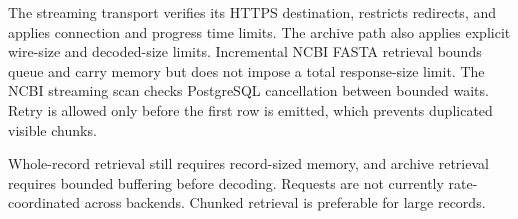 The streaming transport verifies its HTTPS destination, restricts redirects,
and applies connection and progress time limits. The archive path also applies
explicit wire-size and decoded-size limits. Incremental NCBI FASTA retrieval
bounds queue and carry memory but does not impose a total response-size limit.
The NCBI streaming scan checks PostgreSQL cancellation between bounded waits.
Retry is allowed only before the first row is emitted, which prevents duplicated
visible chunks.

Whole-record retrieval still requires record-sized memory, and archive
retrieval requires bounded buffering before decoding. Requests are not currently
rate-coordinated across backends. Chunked retrieval is preferable for large
records.
